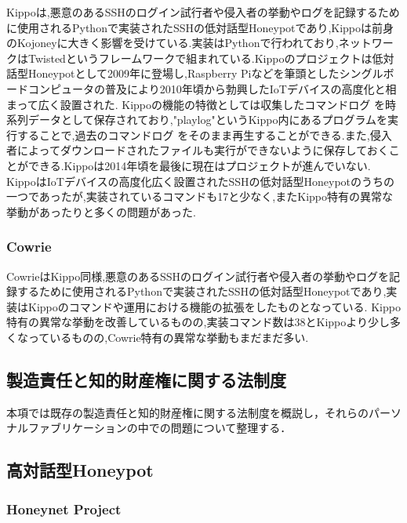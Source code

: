 Kippoは,悪意のあるSSHのログイン試行者や侵入者の挙動やログを記録するために使用されるPythonで実装されたSSHの低対話型Honeypotであり\cite{kippo},Kippoは前身のKojoney\cite{kojoney}に大きく影響を受けている.実装はPythonで行われており,ネットワークはTwisted\cite{twisted}というフレームワークで組まれている.Kippoのプロジェクトは低対話型Honeypotとして2009年に登場し,Raspberry Pi\cite{rasp}などを筆頭としたシングルボードコンピュータ\cite{singleboard}の普及により2010年頃から勃興したIoTデバイスの高度化\cite{iot}と相まって広く設置された.
Kippoの機能の特徴としては収集したコマンドログ を時系列データとして保存されており,"playlog"というKippo内にあるプログラムを実行することで,過去のコマンドログ をそのまま再生することができる.また,侵入者によってダウンロードされたファイルも実行ができないように保存しておくことができる.Kippoは2014年頃を最後に現在はプロジェクトが進んでいない.\cite{kippowiki}
KippoはIoTデバイスの高度化広く設置されたSSHの低対話型Honeypotのうちの一つであったが,実装されているコマンドも17\cite{kippocommand}と少なく,またKippo特有の異常な挙動があったりと多くの問題があった.

\subsubsection{Cowrie}
\label{tech:Cowrie}
CowrieはKippo同様,悪意のあるSSHのログイン試行者や侵入者の挙動やログを記録するために使用されるPythonで実装されたSSHの低対話型Honeypotであり,実装はKippoのコマンドや運用における機能の拡張をしたものとなっている.
Kippo特有の異常な挙動を改善しているものの,実装コマンド数は38\cite{cowriecommand}とKippoより少し多くなっているものの\cite{differfromkippo},Cowrie特有の異常な挙動もまだまだ多い.

\subsection{製造責任と知的財産権に関する法制度}
\label{tech:lows}

本項では既存の製造責任と知的財産権に関する法制度を概説し，それらのパーソナルファブリケーションの中での問題について整理する．

\subsection{高対話型Honeypot}
\label{tech:HighInteractionHoneypot}

\subsubsection{Honeynet Project}
\label{tech:Honeynet}

